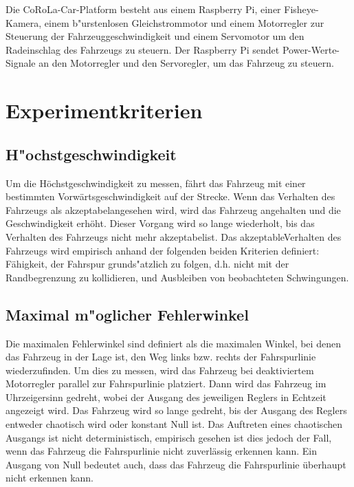 \documentclass[arbeit=studie,oneside,BCOR=12mm]{ArbeitRST}
\begin{document}
Die CoRoLa-Car-Platform besteht aus einem Raspberry Pi, einer Fisheye-Kamera,
einem b"urstenlosen Gleichstrommotor und einem Motorregler zur Steuerung der
Fahrzeuggeschwindigkeit und einem Servomotor um den Radeinschlag des Fahrzeugs
zu steuern. Der Raspberry Pi sendet Power-Werte-Signale an den
Motorregler und den Servoregler, um das Fahrzeug zu steuern. 

\section{Experimentkriterien}

\subsection{H"ochstgeschwindigkeit}

Um die Höchstgeschwindigkeit zu messen, fährt das Fahrzeug mit einer bestimmten
Vorwärtsgeschwindigkeit auf der Strecke. Wenn das Verhalten des Fahrzeugs als
\glqq akzeptabel\grqq angesehen wird, wird das Fahrzeug angehalten und die
Geschwindigkeit erhöht. Dieser Vorgang wird so lange wiederholt, bis das
Verhalten des Fahrzeugs nicht mehr \glqq akzeptabel\grqq ist. Das \glqq
akzeptable\grqq Verhalten des Fahrzeugs wird empirisch anhand der folgenden
beiden Kriterien definiert: Fähigkeit, der Fahrspur grunds"atzlich zu folgen, 
d.h. nicht mit der Randbegrenzung zu kollidieren, und Ausbleiben von
beobachteten Schwingungen.

\subsection{Maximal m"oglicher Fehlerwinkel}

Die maximalen Fehlerwinkel sind definiert als die maximalen Winkel, bei denen
das Fahrzeug in der Lage ist, den Weg links bzw. rechts der Fahrspurlinie
wiederzufinden. Um dies zu messen, wird das Fahrzeug bei deaktiviertem
Motorregler parallel zur Fahrspurlinie platziert. Dann wird das Fahrzeug
im Uhrzeigersinn gedreht, wobei der Ausgang des jeweiligen Reglers in Echtzeit
angezeigt wird. Das Fahrzeug wird so lange gedreht, bis der Ausgang des Reglers
entweder chaotisch wird oder konstant Null ist. Das Auftreten eines
chaotischen Ausgangs ist nicht deterministisch, empirisch gesehen ist dies
jedoch der Fall, wenn das Fahrzeug die Fahrspurlinie nicht zuverlässig erkennen
kann. Ein Ausgang von Null bedeutet auch, dass das Fahrzeug die Fahrspurlinie
überhaupt nicht erkennen kann.
\end{document}
